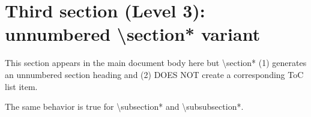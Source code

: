 \section*{Third section (Level 3): unnumbered \textbackslash section* variant}
%
This section appears in the main document body here but \textbackslash section* (1) generates an unnumbered section heading
and (2) DOES NOT create a corresponding ToC list item.

The same behavior is true for \textbackslash subsection* and \textbackslash subsubsection*.
\endinput 